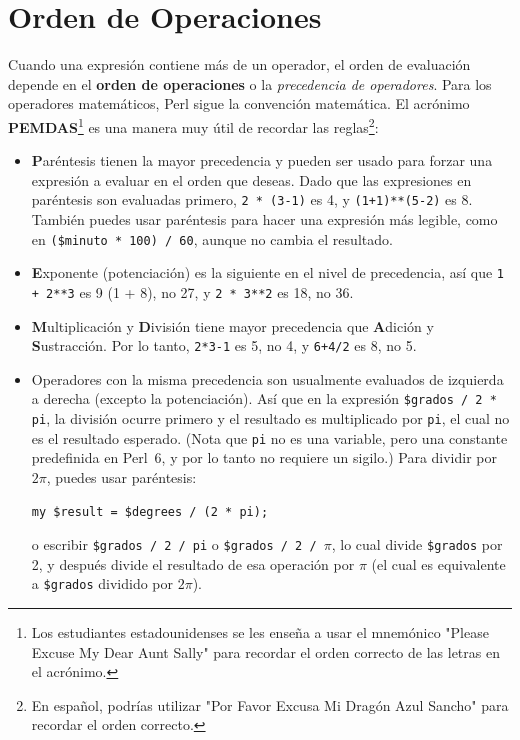 \section{Orden de Operaciones}

Cuando una expresión contiene más de un operador, el orden 
de evaluación depende en el {\bf orden de operaciones} o 
la \emph{precedencia de operadores}. Para los operadores matemáticos,
Perl sigue la convención matemática. El acrónimo {\bf PEMDAS}\footnote{Los estudiantes 
estadounidenses se les enseña a usar el mnemónico 
"Please Excuse My Dear Aunt Sally" para recordar el orden 
correcto de las letras en el acrónimo.} es una manera muy útil de recordar
las reglas\footnote{En español, podrías utilizar "Por Favor Excusa Mi Dragón Azul Sancho" para
recordar el orden correcto.}:
 
\begin{itemize}

\item {\bf P}aréntesis tienen la mayor precedencia y pueden ser 
usado para forzar una expresión a evaluar en el orden que deseas.
Dado que las expresiones en paréntesis son evaluadas primero, 
{\tt 2 * (3-1)} es 4, y {\tt (1+1)**(5-2)} es 8.  También puedes usar 
paréntesis para hacer una expresión más legible, como en {\tt (\$minuto * 100) / 60},
aunque no cambia el resultado.

\item {\bf E}xponente (potenciación) es la siguiente en el nivel de precedencia, así
que {\tt 1 + 2**3} es 9 (1 + 8), no 27, y {\tt 2 * 3**2} es 18, no 36.

\item {\bf M}ultiplicación y {\bf D}ivisión tiene mayor precedencia
  que {\bf A}dición y {\bf S}ustracción.  Por lo tanto, {\tt 2*3-1} es 5, no
  4, y {\tt 6+4/2} es 8, no 5.

\item Operadores con la misma precedencia son usualmente evaluados
de izquierda a derecha (excepto la potenciación). Así que en la expresión
{\tt \$grados / 2 * pi}, la división ocurre primero y el resultado 
es multiplicado por {\tt pi}, el cual no es el resultado esperado. (Nota que 
{\tt pi} no es una variable, pero una constante predefinida en Perl~6, y por lo tanto
no requiere un sigilo.) Para dividir por $2 \pi$, puedes usar paréntesis: 
  
\begin{lstlisting}
my $result = $degrees / (2 * pi);  
\end{lstlisting}  
 
o escribir 
  {\tt \$grados / 2 / pi} o {\tt \$grados / 2 / $\pi$}, lo cual
  divide \verb'$grados' por 2, y después divide el resultado de esa
  operación por $\pi$ (el cual es equivalente a \verb'$grados'
  dividido por $2 \pi$).

\end{itemize}

